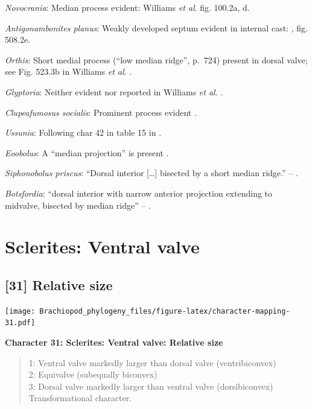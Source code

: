 \documentclass[]{book}
\theoremstyle{definition}
\theoremstyle{definition}
\theoremstyle{definition}
\theoremstyle{remark}
\begin{document}
\emph{Novocrania}: Median process evident: Williams \emph{et al}.
\citeyearpar{Williams2000BrachiopodaLinguliformea} fig. 100.2a, d.

\emph{Antigonambonites planus}: Weakly developed septum evident in
internal cast: \citet{Williams2000BrachiopodaLinguliformea}, fig.
508.2e.

\emph{Orthis}: Short medial process (``low median ridge'', p.~724)
present in dorsal valve; see Fig. 523.3b in Williams \emph{et al}.
\citeyearpar{Williams2000BrachiopodaLinguliformea}.

\emph{Glyptoria}: Neither evident nor reported in Williams \emph{et al}.
\citeyearpar{Williams2000BrachiopodaLinguliformea}.

\emph{Clupeafumosus socialis}: Prominent process evident
\citep{Topper2013Reappraisalof}.

\emph{Ussunia}: Following char 42 in table 15 in
\citet{Williams2000BrachiopodaLinguliformea}.

\emph{Eoobolus}: A ``median projection'' is present \citep[fig. 4g
in][]{Balthasar2009Thebrachiopod}.

\emph{Siphonobolus priscus}: ``Dorsal interior {[}\ldots{}{]} bisected
by a short median ridge.'' -- \citet{Popov2009Earlyontogeny}.

\emph{Botsfordia}: ``dorsal interior with narrow anterior projection
extending to midvalve, bisected by median ridge'' --
\citet{Williams2000BrachiopodaLinguliformea}.

\hypertarget{sclerites-ventral-valve}{%
\section{Sclerites: Ventral valve}\label{sclerites-ventral-valve}}

\hypertarget{relative-size}{%
\subsection*{{[}31{]} Relative size}\label{relative-size}}

\texttt{[image: Brachiopod\_phylogeny\_files/figure-latex/character-mapping-31.pdf]}

\textbf{Character 31: Sclerites: Ventral valve: Relative size}

\begin{quote}
1: Ventral valve markedly larger than dorsal valve (ventribiconvex)\\
2: Equivalve (subequally biconvex)\\
3: Dorsal valve markedly larger than ventral valve (dorsibiconvex)\\
Transformational character.
\end{quote}
\end{document}
